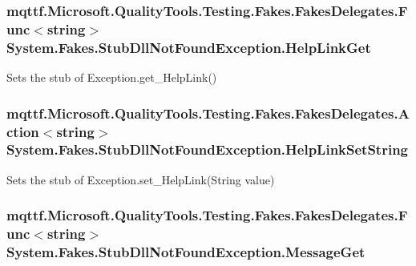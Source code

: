 \hypertarget{class_system_1_1_fakes_1_1_stub_dll_not_found_exception_ac56153f195a3bedd1a2f815517e38f3f}{
\subsubsection[{Help\-Link\-Get}]{\setlength{\rightskip}{0pt plus 5cm}mqttf.\-Microsoft.\-Quality\-Tools.\-Testing.\-Fakes.\-Fakes\-Delegates.\-Func$<$string$>$ System.\-Fakes.\-Stub\-Dll\-Not\-Found\-Exception.\-Help\-Link\-Get}}\label{class_system_1_1_fakes_1_1_stub_dll_not_found_exception_ac56153f195a3bedd1a2f815517e38f3f}


Sets the stub of Exception.\-get\-\_\-\-Help\-Link()

\hypertarget{class_system_1_1_fakes_1_1_stub_dll_not_found_exception_afbf1f32c1eb4cea99e15467951c65d53}{
\subsubsection[{Help\-Link\-Set\-String}]{\setlength{\rightskip}{0pt plus 5cm}mqttf.\-Microsoft.\-Quality\-Tools.\-Testing.\-Fakes.\-Fakes\-Delegates.\-Action$<$string$>$ System.\-Fakes.\-Stub\-Dll\-Not\-Found\-Exception.\-Help\-Link\-Set\-String}}\label{class_system_1_1_fakes_1_1_stub_dll_not_found_exception_afbf1f32c1eb4cea99e15467951c65d53}


Sets the stub of Exception.\-set\-\_\-\-Help\-Link(\-String value)

\hypertarget{class_system_1_1_fakes_1_1_stub_dll_not_found_exception_abd387133c0b6aaab4386c1a35544b0c3}{
\subsubsection[{Message\-Get}]{\setlength{\rightskip}{0pt plus 5cm}mqttf.\-Microsoft.\-Quality\-Tools.\-Testing.\-Fakes.\-Fakes\-Delegates.\-Func$<$string$>$ System.\-Fakes.\-Stub\-Dll\-Not\-Found\-Exception.\-Message\-Get}}\label{class_system_1_1_fakes_1_1_stub_dll_not_found_exception_abd387133c0b6aaab4386c1a35544b0c3}


